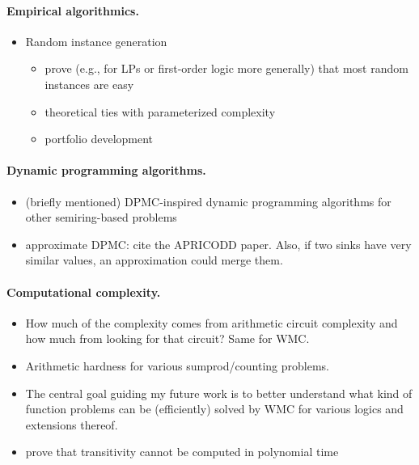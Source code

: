 \paragraph{Empirical algorithmics.}
\begin{itemize}
\item Random instance generation
  \begin{itemize}
  \item prove (e.g., for LPs or first-order logic more generally) that most random instances are easy
  \item theoretical ties with parameterized complexity
  \item portfolio development
  \end{itemize}
\end{itemize}

\paragraph{Dynamic programming algorithms.}
\begin{itemize}
\item (briefly mentioned) DPMC-inspired dynamic programming algorithms for other semiring-based problems
\item approximate DPMC: cite the APRICODD paper. Also, if two sinks have very similar values, an approximation could merge them.
\end{itemize}

\paragraph{Computational complexity.}
\begin{itemize}
\item How much of the complexity comes from arithmetic circuit complexity and how much from looking for that circuit? Same for WMC.
\item Arithmetic hardness for various sumprod/counting problems.
\item The central goal guiding my future work is to better understand what kind of function problems can be (efficiently) solved by WMC for various logics and extensions thereof.
\item prove that transitivity cannot be computed in polynomial time
\end{itemize}


